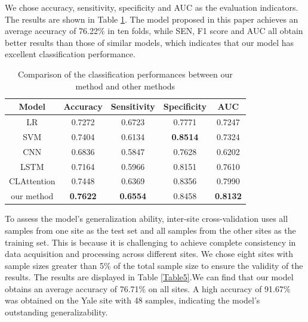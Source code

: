 \documentclass[a4paper]{cas-dc}
\begin{document}
We chose accuracy, sensitivity, specificity and AUC as the evaluation indicators. The results are shown in Table \ref{Table4}. The model proposed in this paper achieves an average accuracy of 76.22\% in ten folds, while SEN, F1 score and AUC all obtain better results than those of similar models, which indicates that our model has excellent classification performance. 
\begin{table}[]
	\caption{Comparison of the classification performances between our method and other methods}\label{Table4}
	\begin{tabular*}{\tblwidth}{@{}ccccc@{}}
		\toprule
		\textbf{Model}& \textbf{Accuracy} & \textbf{Sensitivity} & \textbf{Specificity} & \textbf{AUC} \\ %
		\midrule
		LR             & 0.7272                   & 0.6723                   & 0.7771                   & 0.7247                   \\
		SVM            & 0.7404                   & 0.6134                   & \textbf{0.8514}          & 0.7324                   \\
		CNN         & 0.6836                   & 0.5847                   & 0.7628                   & 0.6202                   \\
		LSTM           & 0.7164                   & 0.5966                   & 0.8151                   & 0.7610                   \\
		CLAttention    & 0.7448                   & 0.6369                   & 0.8356                   & 0.7990                   \\
		our method     & \textbf{\textbf{0.7622}} & \textbf{\textbf{0.6554}} & 0.8458                   & \textbf{\textbf{0.8132}} \\
		\bottomrule
	\end{tabular*}
\end{table}
To assess the model's generalization ability, inter-site cross-validation uses all samples from one site as the test set and all samples from the other sites as the training set. This is because it is challenging to achieve complete consistency in data acquisition and processing across different sites. We chose eight sites with sample sizes greater than 5\% of the total sample size to ensure the validity of the results. The results are displayed in Table \ref{Table5}.We can find that our model obtains an average accuracy of 76.71\% on all sites. A high accuracy of 91.67\% was obtained on the Yale site with 48 samples, indicating the model's outstanding generalizability.
\end{document}
